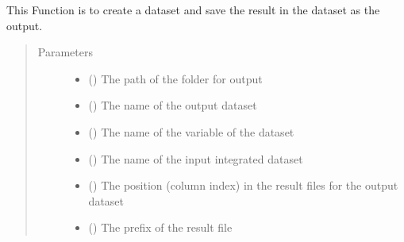 \documentclass[letterpaper,10pt,english]{sphinxmanual}
\begin{document}
\begin{fulllineitems}
\begin{fulllineitems}
\label{\detokenize{AgentTools.util:AgentTools.util.OutputUtil.OutputUtil.save_output}}
This Function is to create a dataset and save the result in the dataset as the output.
\begin{quote}\begin{description}
\item[{Parameters}] \leavevmode\begin{itemize}
\item {} 
 () \textendash{} The path of the folder for output

\item {} 
 () \textendash{} The name of the output dataset

\item {} 
 () \textendash{} The name of the variable of the dataset

\item {} 
 () \textendash{} The name of the input integrated dataset

\item {} 
 () \textendash{} The position (column index) in the result files for the output dataset

\item {} 
 () \textendash{} The prefix of the result file


\end{itemize}
\end{description}
\end{quote}
\end{fulllineitems}
\end{fulllineitems}
\end{document}
